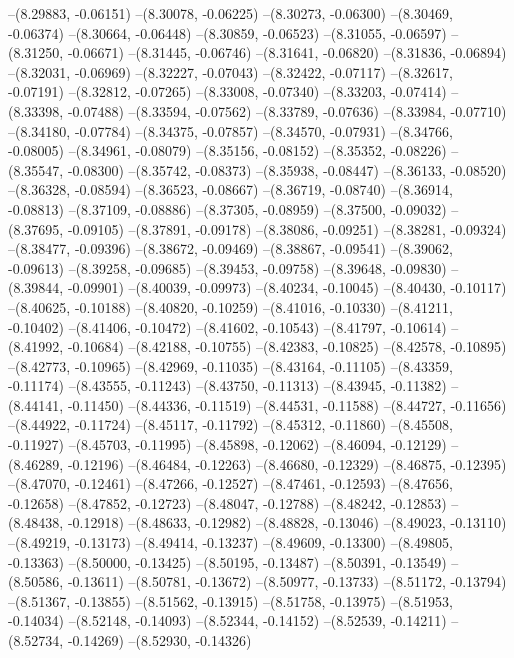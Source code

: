 --(8.29883, -0.06151)
--(8.30078, -0.06225)
--(8.30273, -0.06300)
--(8.30469, -0.06374)
--(8.30664, -0.06448)
--(8.30859, -0.06523)
--(8.31055, -0.06597)
--(8.31250, -0.06671)
--(8.31445, -0.06746)
--(8.31641, -0.06820)
--(8.31836, -0.06894)
--(8.32031, -0.06969)
--(8.32227, -0.07043)
--(8.32422, -0.07117)
--(8.32617, -0.07191)
--(8.32812, -0.07265)
--(8.33008, -0.07340)
--(8.33203, -0.07414)
--(8.33398, -0.07488)
--(8.33594, -0.07562)
--(8.33789, -0.07636)
--(8.33984, -0.07710)
--(8.34180, -0.07784)
--(8.34375, -0.07857)
--(8.34570, -0.07931)
--(8.34766, -0.08005)
--(8.34961, -0.08079)
--(8.35156, -0.08152)
--(8.35352, -0.08226)
--(8.35547, -0.08300)
--(8.35742, -0.08373)
--(8.35938, -0.08447)
--(8.36133, -0.08520)
--(8.36328, -0.08594)
--(8.36523, -0.08667)
--(8.36719, -0.08740)
--(8.36914, -0.08813)
--(8.37109, -0.08886)
--(8.37305, -0.08959)
--(8.37500, -0.09032)
--(8.37695, -0.09105)
--(8.37891, -0.09178)
--(8.38086, -0.09251)
--(8.38281, -0.09324)
--(8.38477, -0.09396)
--(8.38672, -0.09469)
--(8.38867, -0.09541)
--(8.39062, -0.09613)
--(8.39258, -0.09685)
--(8.39453, -0.09758)
--(8.39648, -0.09830)
--(8.39844, -0.09901)
--(8.40039, -0.09973)
--(8.40234, -0.10045)
--(8.40430, -0.10117)
--(8.40625, -0.10188)
--(8.40820, -0.10259)
--(8.41016, -0.10330)
--(8.41211, -0.10402)
--(8.41406, -0.10472)
--(8.41602, -0.10543)
--(8.41797, -0.10614)
--(8.41992, -0.10684)
--(8.42188, -0.10755)
--(8.42383, -0.10825)
--(8.42578, -0.10895)
--(8.42773, -0.10965)
--(8.42969, -0.11035)
--(8.43164, -0.11105)
--(8.43359, -0.11174)
--(8.43555, -0.11243)
--(8.43750, -0.11313)
--(8.43945, -0.11382)
--(8.44141, -0.11450)
--(8.44336, -0.11519)
--(8.44531, -0.11588)
--(8.44727, -0.11656)
--(8.44922, -0.11724)
--(8.45117, -0.11792)
--(8.45312, -0.11860)
--(8.45508, -0.11927)
--(8.45703, -0.11995)
--(8.45898, -0.12062)
--(8.46094, -0.12129)
--(8.46289, -0.12196)
--(8.46484, -0.12263)
--(8.46680, -0.12329)
--(8.46875, -0.12395)
--(8.47070, -0.12461)
--(8.47266, -0.12527)
--(8.47461, -0.12593)
--(8.47656, -0.12658)
--(8.47852, -0.12723)
--(8.48047, -0.12788)
--(8.48242, -0.12853)
--(8.48438, -0.12918)
--(8.48633, -0.12982)
--(8.48828, -0.13046)
--(8.49023, -0.13110)
--(8.49219, -0.13173)
--(8.49414, -0.13237)
--(8.49609, -0.13300)
--(8.49805, -0.13363)
--(8.50000, -0.13425)
--(8.50195, -0.13487)
--(8.50391, -0.13549)
--(8.50586, -0.13611)
--(8.50781, -0.13672)
--(8.50977, -0.13733)
--(8.51172, -0.13794)
--(8.51367, -0.13855)
--(8.51562, -0.13915)
--(8.51758, -0.13975)
--(8.51953, -0.14034)
--(8.52148, -0.14093)
--(8.52344, -0.14152)
--(8.52539, -0.14211)
--(8.52734, -0.14269)
--(8.52930, -0.14326)
